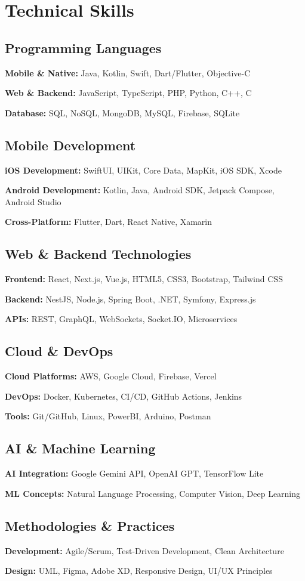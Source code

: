 \documentclass[letterpaper,11pt]{article}
\newcommand{\skillCategory}[2]{
  \begin{skillbox}
    \textbf{\color{secondary}#1:} \color{darkgray}#2
  \end{skillbox}
  \vspace{3pt}
}
\begin{document}
\section{Technical Skills}

\subsection{Programming Languages}
\skillCategory{Mobile \& Native}{Java, Kotlin, Swift, Dart/Flutter, Objective-C}
\skillCategory{Web \& Backend}{JavaScript, TypeScript, PHP, Python, C++, C}
\skillCategory{Database}{SQL, NoSQL, MongoDB, MySQL, Firebase, SQLite}

\subsection{Mobile Development}
\skillCategory{iOS Development}{SwiftUI, UIKit, Core Data, MapKit, iOS SDK, Xcode}
\skillCategory{Android Development}{Kotlin, Java, Android SDK, Jetpack Compose, Android Studio}
\skillCategory{Cross-Platform}{Flutter, Dart, React Native, Xamarin}

\subsection{Web \& Backend Technologies}
\skillCategory{Frontend}{React, Next.js, Vue.js, HTML5, CSS3, Bootstrap, Tailwind CSS}
\skillCategory{Backend}{NestJS, Node.js, Spring Boot, .NET, Symfony, Express.js}
\skillCategory{APIs}{REST, GraphQL, WebSockets, Socket.IO, Microservices}

\subsection{Cloud \& DevOps}
\skillCategory{Cloud Platforms}{AWS, Google Cloud, Firebase, Vercel}
\skillCategory{DevOps}{Docker, Kubernetes, CI/CD, GitHub Actions, Jenkins}
\skillCategory{Tools}{Git/GitHub, Linux, PowerBI, Arduino, Postman}

\subsection{AI \& Machine Learning}
\skillCategory{AI Integration}{Google Gemini API, OpenAI GPT, TensorFlow Lite}
\skillCategory{ML Concepts}{Natural Language Processing, Computer Vision, Deep Learning}

\subsection{Methodologies \& Practices}
\skillCategory{Development}{Agile/Scrum, Test-Driven Development, Clean Architecture}
\skillCategory{Design}{UML, Figma, Adobe XD, Responsive Design, UI/UX Principles}
\end{document}
